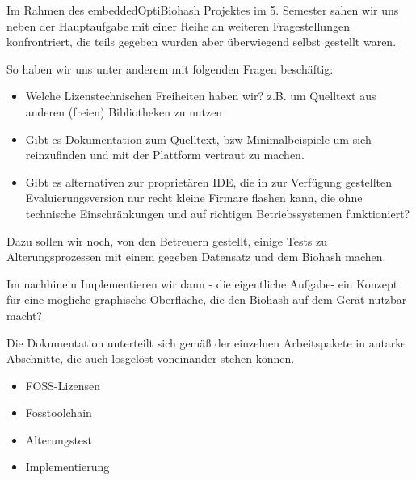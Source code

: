 Im Rahmen des embeddedOptiBiohash Projektes im 5. Semester sahen wir uns neben der Hauptaufgabe mit einer Reihe an weiteren Fragestellungen konfrontriert, die teils gegeben wurden aber überwiegend selbst gestellt waren.

\noindent So haben wir uns unter anderem mit folgenden Fragen beschäftig:
\begin{itemize}
\item Welche Lizenstechnischen Freiheiten haben wir? z.B. um Quelltext aus anderen (freien) Bibliotheken zu nutzen
\item Gibt es Dokumentation zum Quelltext, bzw Minimalbeispiele um sich reinzufinden und mit der Plattform vertraut zu machen.
\item Gibt es alternativen zur proprietären IDE, die in zur Verfügung gestellten Evaluierungsversion nur recht kleine Firmare flashen kann, die ohne technische Einschränkungen und  auf richtigen Betriebssystemen funktioniert?
\end{itemize}

\noindent Dazu sollen wir noch, von den Betreuern gestellt, einige Tests zu Alterungsprozessen mit einem gegeben Datensatz und dem Biohash machen.


\noindent Im nachhinein Implementieren wir dann - die eigentliche Aufgabe- ein Konzept für eine mögliche graphische Oberfläche, die den Biohash auf dem Gerät nutzbar macht?


\noindent Die Dokumentation unterteilt sich gemäß der einzelnen Arbeitspakete in autarke Abschnitte, die auch losgelöst voneinander stehen können.

\begin{itemize}
\item  FOSS-Lizensen
\item  Fosstoolchain
\item  Alterungstest
\item  Implementierung
\end{itemize}
